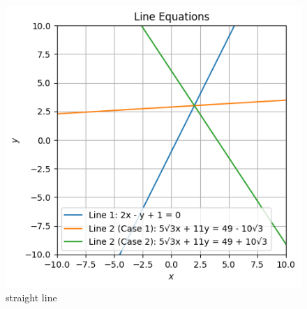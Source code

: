 \documentclass[10pt]{article}
\begin{document}
\begin{figure}
    \centering
    \includegraphics[width=\columnwidth]{line.png}
    \caption{straight line}
    \label{fig:enter-label}
\end{figure}
\end{document}
